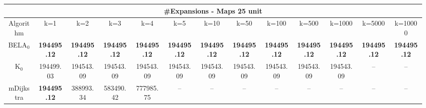 \begin{tabular}{c|cccccccccccc}\toprule
\multicolumn{13}{c}{#Expansions - Maps 25 unit}\\ \midrule
Algorithm & k=1 & k=2 & k=3 & k=4 & k=5 & k=10 & k=50 & k=100 & k=500 & k=1000 & k=5000 & k=10000 \\ \midrule
BELA$_0$ & \textbf{194495.12} & \textbf{194495.12} & \textbf{194495.12} & \textbf{194495.12} & \textbf{194495.12} & \textbf{194495.12} & \textbf{194495.12} & \textbf{194495.12} & \textbf{194495.12} & \textbf{194495.12} & \textbf{194495.12} & \textbf{194495.12} \\
K$_0$ & 194499.03 & 194543.09 & 194543.09 & 194543.09 & 194543.09 & 194543.09 & 194543.09 & 194543.09 & 194543.09 & 194543.09 & -- & -- \\
mDijkstra & \textbf{194495.12} & 388993.34 & 583490.42 & 777985.75 & -- & -- & -- & -- & -- & -- & -- & -- \\ \bottomrule 
\end{tabular}
